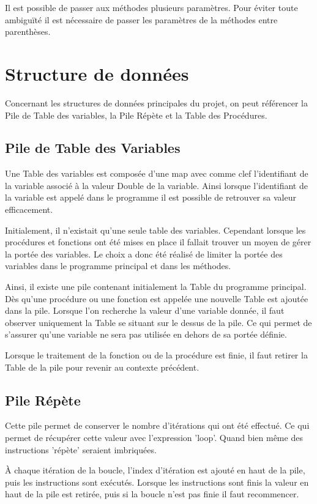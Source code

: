 \documentclass[a4paper,11pt]{article}
\begin{document}
Il est possible de passer aux méthodes plusieurs paramètres. Pour éviter toute ambiguïté il est nécessaire de passer les paramètres de la méthodes entre parenthèses.  




\section{Structure de données}
Concernant les structures de données principales du projet, on peut référencer la Pile de Table des variables, la Pile Répète et la Table des Procédures.

\subsection{Pile de Table des Variables}
Une Table des variables est composée d'une map avec comme clef l'identifiant de la variable associé à la valeur Double de la variable. Ainsi lorsque l'identifiant de la variable est appelé dans le programme il est possible de retrouver sa valeur efficacement.

Initialement, il n'existait qu'une seule table des variables. Cependant lorsque les procédures et fonctions ont été mises en place il fallait trouver un moyen de gérer la portée des variables.
Le choix a donc été réalisé de limiter la portée des variables dans le programme principal et dans les méthodes. 

Ainsi, il existe une pile contenant initialement la Table du programme principal. Dès qu'une procédure ou une fonction est appelée une nouvelle Table est ajoutée dans la pile.
Lorsque l'on recherche la valeur d'une variable donnée, il faut observer uniquement la Table se situant sur le dessus de la pile. Ce qui permet de s'assurer qu'une variable ne sera pas utilisée en dehors de sa portée définie.

Lorsque le traitement de la fonction ou de la procédure est finie, il faut retirer la Table de la pile pour revenir au contexte précédent.


\subsection{Pile Répète}
Cette pile permet de conserver le nombre d'itérations qui ont été effectué. Ce qui permet de récupérer cette valeur avec l'expression 'loop'. Quand bien même des instructions 'répète' seraient imbriquées.

À chaque itération de la boucle, l'index d'itération est ajouté en haut de la pile, puis les instructions sont exécutés. Lorsque les instructions sont finis la valeur en haut de la pile est retirée, puis si la boucle n'est pas finie il faut recommencer. 
\end{document}
